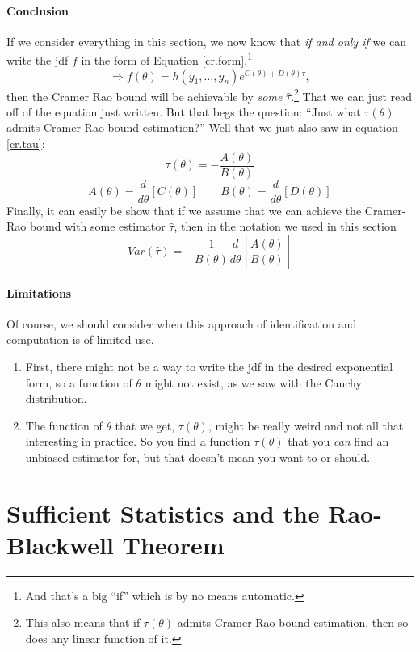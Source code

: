 \documentclass[a4paper,12pt]{scrartcl}
\begin{document}
\newpage
\paragraph{Conclusion} If we consider everything in this 
section, we now know that \emph{if and only if} we can write the jdf
$f$ in the form of Equation 
\ref{cr.form},\footnote{And that's a big ``if''
which is by no means automatic.}
   \[ \Rightarrow f(\theta) = h(y_1, \ldots, y_n) e^{C(\theta)  
      + D(\theta)  \hat{\tau} },  \]
then the Cramer Rao bound will be achievable by \emph{some}
$\hat{\tau}$.\footnote{This also means that if $\tau(\theta)$ admits 
Cramer-Rao bound estimation, then so does any linear function of it.} 
That we can just read off of the equation just written.
But that begs the question: ``Just what $\tau(\theta)$ admits 
Cramer-Rao bound estimation?'' Well that we just also saw in equation
\ref{cr.tau}:
\[ \tau(\theta) = -\frac{A(\theta)}{B(\theta)} \]
\[ A(\theta) = \frac{d}{d\theta}\left[ C(\theta)\right] \qquad 
   B(\theta) = \frac{d}{d\theta}\left[ D(\theta)\right] \]
Finally, it can easily be show that if we assume that we can achieve
the Cramer-Rao bound with some estimator $\hat{\tau}$, then in 
the notation we used in this section
   \[ Var(\hat{\tau}) = -\frac{1}{B(\theta)} \frac{d}{d\theta} \left[
      \frac{A(\theta)}{B(\theta)}\right] \]

\paragraph{Limitations} Of course, we should consider when this
approach of identification and computation is of limited use.
\begin{enumerate}
   \item First, there might not be a way to write the jdf in the
      desired exponential form, so a function of $\theta$ might not
      exist, as we saw with the Cauchy distribution.
   \item The function of $\theta$ that we get, $\tau(\theta)$, might
      be really weird and not all that interesting in practice. So
      you find a function $\tau(\theta)$ that you \emph{can}
      find an unbiased estimator for, but that doesn't mean you want to
      or should.
\end{enumerate}


\newpage
\section{Sufficient Statistics and the Rao-Blackwell Theorem}
\end{document}
